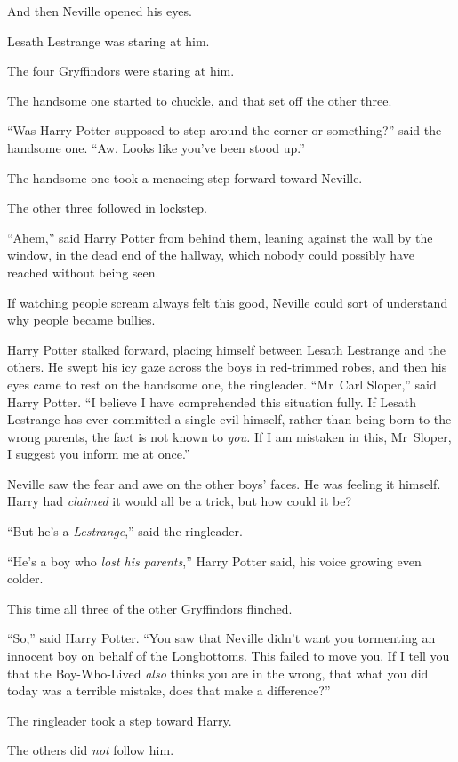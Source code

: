 And then Neville opened his eyes.

Lesath Lestrange was staring at him.

The four Gryffindors were staring at him.

The handsome one started to chuckle, and that set off the other three.

“Was Harry Potter supposed to step around the corner or something?” said the
handsome one. “Aw. Looks like you’ve been stood up.”

The handsome one took a menacing step forward toward Neville.

The other three followed in lockstep.

“Ahem,” said Harry Potter from behind them, leaning against the wall by the
window, in the dead end of the hallway, which nobody could possibly have reached
without being seen.

If watching people scream always felt this good, Neville could sort of
understand why people became bullies.

Harry Potter stalked forward, placing himself between Lesath Lestrange and the
others. He swept his icy gaze across the boys in red-trimmed robes, and then
his eyes came to rest on the handsome one, the ringleader. “Mr~Carl Sloper,”
said Harry Potter. “I believe I have comprehended this situation fully. If
Lesath Lestrange has ever committed a single evil himself, rather than being
born to the wrong parents, the fact is not known to \emph{you.} If I am
mistaken in this, Mr~Sloper, I suggest you inform me at once.”

Neville saw the fear and awe on the other boys’ faces. He was feeling it
himself. Harry had \emph{claimed} it would all be a trick, but how could it be?

“But he’s a \emph{Lestrange},” said the ringleader.

“He’s a boy who \emph{lost his parents},” Harry Potter said, his voice growing
even colder.

This time all three of the other Gryffindors flinched.

“So,” said Harry Potter. “You saw that Neville didn’t want you tormenting an
innocent boy on behalf of the Longbottoms. This failed to move you. If I tell
you that the Boy-Who-Lived \emph{also} thinks you are in the wrong, that what
you did today was a terrible mistake, does that make a difference?”

The ringleader took a step toward Harry.

The others did \emph{not} follow him.

